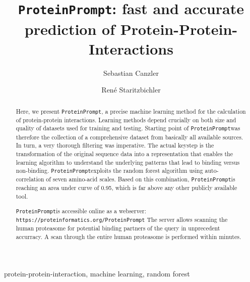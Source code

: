 \documentclass[preprint,3p,times,twocolumn]{elsarticle}
\newcommand{\url}[1]{\texttt{https://\small #1}}
\newcommand{\toolblank}{\texttt{ProteinPrompt}}
\newcommand{\tool}{\toolblank\hspace{2pt}}
\newcommand{\website}{\url{proteinformatics.org/\tool}}
\begin{document}
\begin{frontmatter}
   
\title{\tool: fast and accurate prediction of Protein-Protein-Interactions}

\author[LEI,IMT]{Sebastian Canzler}
\author[PHY,IMT]{Ren\'{e} Staritzbichler}


\address[LEI]{Bioinformatics Group, Department of Computer Science,
  University of Leipzig,
  H{\"a}rtelstra{\ss}e 16-18, 04107 Leipzig, Germany
}
\address[PHY]{ProteinFormatics Group, Institute of Medical Physics and Biophysics, University of Leipzig,
  H{\"a}rtelstra{\ss}e 16-18, 04107 Leipzig, Germany.}

\address[IMT]{Immuthera GmbH, L{\"o}{\ss}niger Stra{\ss}e 16, 04275 Leipzig, Germany.}



 

\begin{abstract}

  Here, we present \tool, a precise machine learning method for the calculation of protein-protein interactions.
  Learning methods depend crucially on both size and quality of datasets used for training and testing.
  Starting point of \tool was therefore the collection of a comprehensive dataset from basically all available sources.
  In turn, a very thorough filtering was imperative.
  The actual keystep is the transformation of the original sequence data into a representation that enables the learning algorithm to understand the underlying patterns that lead to binding versus non-binding.
   \tool exploits the random forest algorithm using auto-correlation of seven amino-acid scales.
   Based on this combination, \tool is reaching an area under curve of 0.95, which is far above any other publicly available tool. 
  
  \tool  is accessible online as a webserver:
  \website
  The server allows  scanning the human proteasome for potential binding partners of the query in unprecedent accurracy.
  A scan through the entire human proteasome is performed within minutes.  
  

\end{abstract}

\begin{keyword}
  protein-protein-interaction, machine learning, random forest
\end{keyword}

\end{frontmatter}
\end{document}
